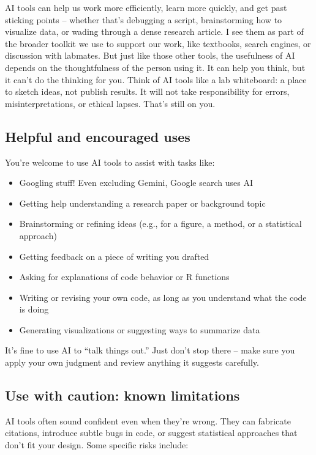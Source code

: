\documentclass[
]{book}
\providecommand{\tightlist}{%
  \setlength{\itemsep}{0pt}\setlength{\parskip}{0pt}}
\begin{document}
AI tools can help us work more efficiently, learn more quickly, and get past sticking points -- whether that's debugging a script, brainstorming how to visualize data, or wading through a dense research article. I see them as part of the broader toolkit we use to support our work, like textbooks, search engines, or discussion with labmates. But just like those other tools, the usefulness of AI depends on the thoughtfulness of the person using it. It can help you think, but it can't do the thinking for you. Think of AI tools like a lab whiteboard: a place to sketch ideas, not publish results. It will not take responsibility for errors, misinterpretations, or ethical lapses. That's still on you.

\subsection{Helpful and encouraged uses}\label{helpful-and-encouraged-uses}

You're welcome to use AI tools to assist with tasks like:

\begin{itemize}
\tightlist
\item
  Googling stuff! Even excluding Gemini, Google search uses AI
\item
  Getting help understanding a research paper or background topic
\item
  Brainstorming or refining ideas (e.g., for a figure, a method, or a statistical approach)
\item
  Getting feedback on a piece of writing you drafted
\item
  Asking for explanations of code behavior or R functions
\item
  Writing or revising your own code, as long as you understand what the code is doing
\item
  Generating visualizations or suggesting ways to summarize data
\end{itemize}

It's fine to use AI to ``talk things out.'' Just don't stop there -- make sure you apply your own judgment and review anything it suggests carefully.

\subsection{Use with caution: known limitations}\label{use-with-caution-known-limitations}

AI tools often sound confident even when they're wrong. They can fabricate citations, introduce subtle bugs in code, or suggest statistical approaches that don't fit your design. Some specific risks include:
\end{document}
